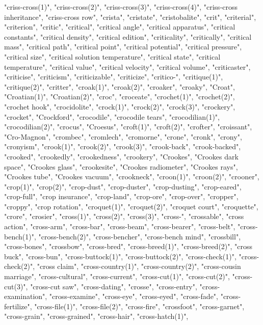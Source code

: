 "criss-cross(1)",
"criss-cross(2)",
"criss-cross(3)",
"criss-cross(4)",
"criss-cross inheritance",
"criss-cross row",
"crista",
"cristate",
"cristobalite",
"crit",
"criterial",
"criterion",
"critic",
"critical",
"critical angle",
"critical apparatus",
"critical constants",
"critical density",
"critical edition",
"criticality",
"critically",
"critical mass",
"critical path",
"critical point",
"critical potential",
"critical pressure",
"critical size",
"critical solution temperature",
"critical state",
"critical temperature",
"critical value",
"critical velocity",
"critical volume",
"criticaster",
"criticise",
"criticism",
"criticizable",
"criticize",
"critico-",
"critique(1)",
"critique(2)",
"critter",
"croak(1)",
"croak(2)",
"croaker",
"croaky",
"Croat",
"Croatian(1)",
"Croatian(2)",
"croc",
"croceate",
"crochet(1)",
"crochet(2)",
"crochet hook",
"crocidolite",
"crock(1)",
"crock(2)",
"crock(3)",
"crockery",
"crocket",
"Crockford",
"crocodile",
"crocodile tears",
"crocodilian(1)",
"crocodilian(2)",
"crocus",
"Croesus",
"croft(1)",
"croft(2)",
"crofter",
"croissant",
"Cro-Magnon",
"crombec",
"cromlech",
"cromorne",
"crone",
"cronk",
"crony",
"cronyism",
"crook(1)",
"crook(2)",
"crook(3)",
"crook-back",
"crook-backed",
"crooked",
"crookedly",
"crookedness",
"crookery",
"Crookes",
"Crookes dark space",
"Crookes glass",
"crookesite",
"Crookes radiometer",
"Crookes rays",
"Crookes tube",
"Crookes vacuum",
"crookneck",
"croon(1)",
"croon(2)",
"crooner",
"crop(1)",
"crop(2)",
"crop-dust",
"crop-duster",
"crop-dusting",
"crop-eared",
"crop-full",
"crop insurance",
"crop-land",
"crop-ore",
"crop-over",
"cropper",
"croppy",
"crop rotation",
"croquet(1)",
"croquet(2)",
"croquet court",
"croquette",
"crore",
"crosier",
"cross(1)",
"cross(2)",
"cross(3)",
"cross-",
"crossable",
"cross action",
"cross-arm",
"cross-bar",
"cross-beam",
"cross-bearer",
"cross-belt",
"cross-bench(1)",
"cross-bench(2)",
"cross-bencher",
"cross-bench mind",
"crossbill",
"cross-bones",
"crossbow",
"cross-bred",
"cross-breed(1)",
"cross-breed(2)",
"cross buck",
"cross-bun",
"cross-buttock(1)",
"cross-buttock(2)",
"cross-check(1)",
"cross-check(2)",
"cross claim",
"cross-country(1)",
"cross-country(2)",
"cross-cousin marriage",
"cross-cultural",
"cross-current",
"cross-cut(1)",
"cross-cut(2)",
"cross-cut(3)",
"cross-cut saw",
"cross-dating",
"crosse",
"cross-entry",
"cross-examination",
"cross-examine",
"cross-eye",
"cross-eyed",
"cross-fade",
"cross-fertilize",
"cross-file(1)",
"cross-file(2)",
"cross-fire",
"crossfoot",
"cross-garnet",
"cross-grain",
"cross-grained",
"cross-hair",
"cross-hatch(1)",
